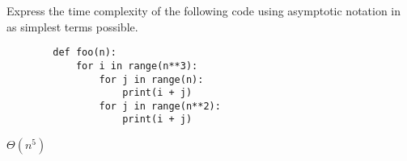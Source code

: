 \begin{prob}
    Express the time complexity of the following code using asymptotic
    notation in as simplest terms possible.

    \begin{verbatim}
        def foo(n):
            for i in range(n**3):
                for j in range(n):
                    print(i + j)
                for j in range(n**2):
                    print(i + j)
    \end{verbatim}

    \begin{soln}
        $\Theta(n^5)$
    \end{soln}

\end{prob}
